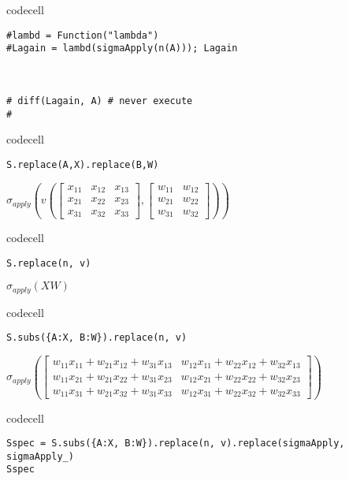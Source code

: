 codecell

\begin{verbatim}
#lambd = Function("lambda")
#Lagain = lambd(sigmaApply(n(A))); Lagain



# diff(Lagain, A) # never execute
#
\end{verbatim}


codecell

\begin{verbatim}
S.replace(A,X).replace(B,W)
\end{verbatim}

$\displaystyle \sigma_{apply}{\left(v{\left(\left[\begin{matrix}x_{11} & x_{12} & x_{13}\\x_{21} & x_{22} & x_{23}\\x_{31} & x_{32} & x_{33}\end{matrix}\right],\left[\begin{matrix}w_{11} & w_{12}\\w_{21} & w_{22}\\w_{31} & w_{32}\end{matrix}\right] \right)} \right)}$

codecell

\begin{verbatim}
S.replace(n, v)
\end{verbatim}

$\displaystyle \sigma_{apply}{\left(X W \right)}$

codecell

\begin{verbatim}
S.subs({A:X, B:W}).replace(n, v)
\end{verbatim}

$\displaystyle \sigma_{apply}{\left(\left[\begin{matrix}w_{11} x_{11} + w_{21} x_{12} + w_{31} x_{13} & w_{12} x_{11} + w_{22} x_{12} + w_{32} x_{13}\\w_{11} x_{21} + w_{21} x_{22} + w_{31} x_{23} & w_{12} x_{21} + w_{22} x_{22} + w_{32} x_{23}\\w_{11} x_{31} + w_{21} x_{32} + w_{31} x_{33} & w_{12} x_{31} + w_{22} x_{32} + w_{32} x_{33}\end{matrix}\right] \right)}$

codecell

\begin{verbatim}
Sspec = S.subs({A:X, B:W}).replace(n, v).replace(sigmaApply, sigmaApply_)
Sspec
\end{verbatim}

